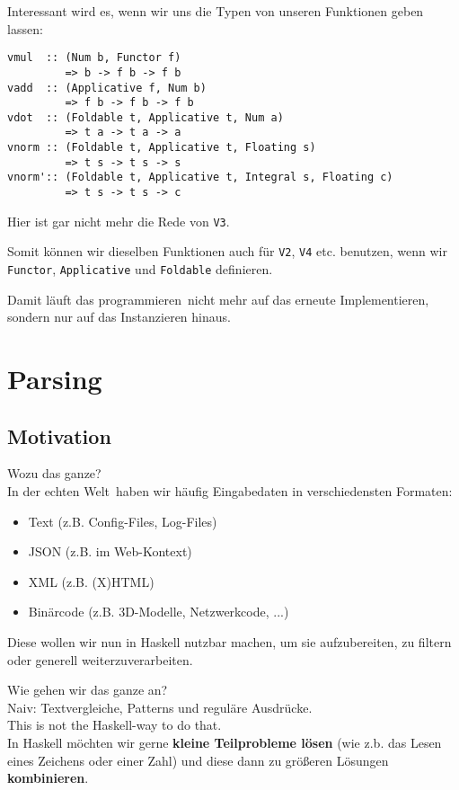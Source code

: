 \documentclass{beamer}
\begin{document}
\begin{frame}[fragile]
Interessant wird es, wenn wir uns die Typen von unseren Funktionen geben lassen:
\begin{verbatim}
vmul  :: (Num b, Functor f)
         => b -> f b -> f b
vadd  :: (Applicative f, Num b)
         => f b -> f b -> f b
vdot  :: (Foldable t, Applicative t, Num a)
         => t a -> t a -> a
vnorm :: (Foldable t, Applicative t, Floating s)
         => t s -> t s -> s
vnorm':: (Foldable t, Applicative t, Integral s, Floating c)
         => t s -> t s -> c
\end{verbatim}
\pause
Hier ist gar nicht mehr die Rede von \texttt{V3}.\\\par
\pause
Somit können wir dieselben Funktionen auch für \texttt{V2}, \texttt{V4} etc. benutzen, wenn wir \texttt{Functor}, \texttt{Applicative} und \texttt{Foldable} definieren.\\\par
\pause
Damit läuft das \glqq programmieren\grqq \ nicht mehr auf das erneute Implementieren, sondern nur auf das Instanzieren hinaus.
\end{frame}


\section{Parsing}

\subsection{Motivation}

\begin{frame}[fragile]
\large Wozu das ganze?\\
\normalsize In der \glqq echten Welt\grqq \ haben wir häufig Eingabedaten in verschiedensten Formaten:
\begin{itemize}
 \item Text (z.B. Config-Files, Log-Files)
 \item JSON (z.B. im Web-Kontext)
 \item XML (z.B. (X)HTML)
 \item Binärcode (z.B. 3D-Modelle, Netzwerkcode, ...)
\end{itemize}
\pause
Diese wollen wir nun in Haskell nutzbar machen, um sie aufzubereiten, zu filtern oder generell weiterzuverarbeiten.
\end{frame}

\begin{frame}[fragile]
\large Wie gehen wir das ganze an?\\
\normalsize Naiv: Textvergleiche, Patterns und reguläre Ausdrücke.\\
\bigskip
\pause
This is not the Haskell-way to do that.\\
\bigskip
\pause
In Haskell möchten wir gerne \textbf{kleine Teilprobleme lösen} (wie z.b. das Lesen eines Zeichens oder einer Zahl) und diese dann zu größeren Lösungen \textbf{kombinieren}.
\end{frame}
\end{document}
